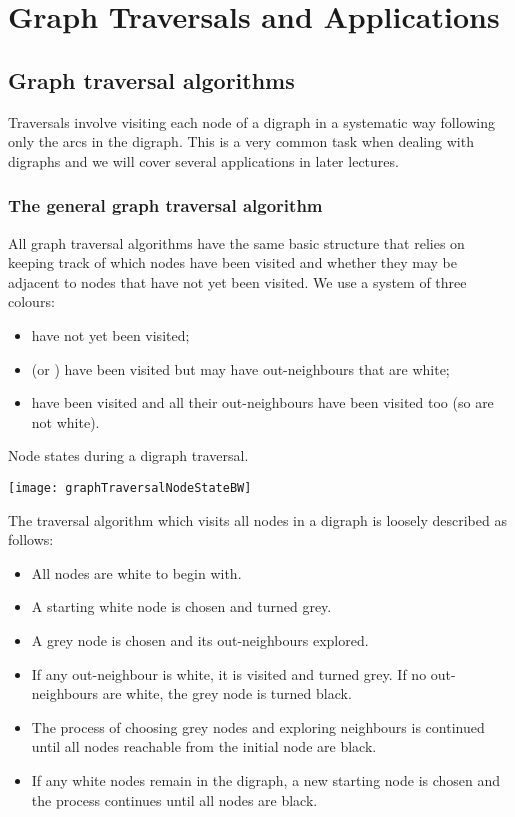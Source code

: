 \part{Graph Traversals and Applications}
\label{ch:traversal}

\chapter{Graph traversal algorithms} %
Traversals involve visiting each node of a digraph in a systematic way following only the arcs in the digraph. 
This is a very common task when dealing with digraphs and we will cover several applications in later lectures.

\section{The general graph traversal algorithm} \label{sec:trav}
All graph traversal algorithms have the same basic structure that relies on keeping track of which nodes have been visited 
and whether they may be adjacent to nodes that have not yet been visited. We use a system of three colours:
\begin{itemize} 
  \item {} have not yet been visited;
  \item {} (or ) have been visited but may have
  out-neighbours that are white;
  \item {} have been visited and all their out-neighbours have been visited too (so are not white). 
\end{itemize} 

\begin{Boxample}
Node states during a digraph traversal.
\begin{center}
  \texttt{[image: graphTraversalNodeStateBW]}
\end{center}
\end{Boxample}

The traversal algorithm which visits all nodes in a digraph is loosely described as follows: 
\begin{itemize}
  \item All nodes are white to begin with.
  \item A starting white node is chosen and turned grey.
  \item A grey node is chosen and its out-neighbours explored. 
  \item If any out-neighbour is white, it is visited and turned grey. 
  If no out-neighbours are white, the grey node is turned black. 
  \item The process of choosing grey nodes and exploring neighbours is continued 
  until all nodes reachable from the initial node are black.
  \item If any white nodes remain in the digraph, a new starting node is chosen 
  and the process continues until all nodes are black.
\end{itemize}

